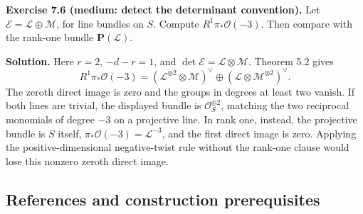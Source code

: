 \documentclass[11pt]{article}
\begin{document}
\textbf{Exercise 7.6 (medium: detect the determinant convention).} Let
\(\mathcal E=\mathcal L\oplus\mathcal M\), for line bundles on \(S\).
Compute \(R^1\pi_*\mathcal O(-3)\). Then compare with the rank-one
bundle \(\mathbf P(\mathcal L)\).

\textbf{Solution.} Here \(r=2\), \(-d-r=1\), and
\(\det\mathcal E=\mathcal L\otimes\mathcal M\). Theorem 5.2 gives \[
R^1\pi_*\mathcal O(-3)
=(\mathcal L^{\otimes2}\otimes\mathcal M)^\vee
\oplus(\mathcal L\otimes\mathcal M^{\otimes2})^\vee.
\] The zeroth direct image is zero and the groups in degrees at least
two vanish. If both lines are trivial, the displayed bundle is
\(\mathcal O_S^{\oplus2}\), matching the two reciprocal monomials of
degree \(-3\) on a projective line. In rank one, instead, the projective
bundle is \(S\) itself, \(\pi_*\mathcal O(-3)=\mathcal L^{-3}\), and the
first direct image is zero. Applying the positive-dimensional
negative-twist rule without the rank-one clause would lose this nonzero
zeroth direct image.

\subsection{References and construction
prerequisites}\label{references-and-construction-prerequisites}
\end{document}
